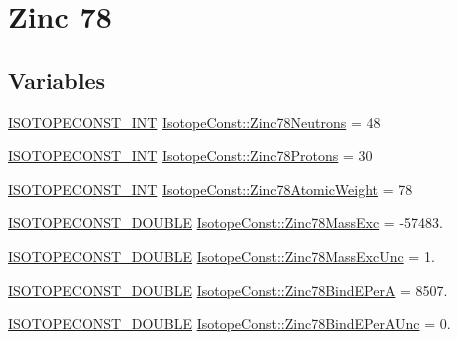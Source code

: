 \hypertarget{group___isotope_const-_zinc-_zn78}{}\section{Zinc 78}
\label{group___isotope_const-_zinc-_zn78}
\subsection*{Variables}
\begin{DoxyCompactItemize}
\item 
\mbox{\hyperlink{group___isotope_const-_macros_ga5f18360b3e99483a35c32d789e62621c}{I\+S\+O\+T\+O\+P\+E\+C\+O\+N\+S\+T\+\_\+\+I\+NT}} \mbox{\hyperlink{group___isotope_const-_zinc-_zn78_ga18bdd09a13d201356f2e234b10324876}{Isotope\+Const\+::\+Zinc78\+Neutrons}} = 48
\item 
\mbox{\hyperlink{group___isotope_const-_macros_ga5f18360b3e99483a35c32d789e62621c}{I\+S\+O\+T\+O\+P\+E\+C\+O\+N\+S\+T\+\_\+\+I\+NT}} \mbox{\hyperlink{group___isotope_const-_zinc-_zn78_gac7eeadc5f3c35cb2d267be5510017b19}{Isotope\+Const\+::\+Zinc78\+Protons}} = 30
\item 
\mbox{\hyperlink{group___isotope_const-_macros_ga5f18360b3e99483a35c32d789e62621c}{I\+S\+O\+T\+O\+P\+E\+C\+O\+N\+S\+T\+\_\+\+I\+NT}} \mbox{\hyperlink{group___isotope_const-_zinc-_zn78_gaee415fd90fd7a371f87d74ef248eedd3}{Isotope\+Const\+::\+Zinc78\+Atomic\+Weight}} = 78
\item 
\mbox{\hyperlink{group___isotope_const-_macros_ga8f45a7272ce02c0b4c65c44636ed719a}{I\+S\+O\+T\+O\+P\+E\+C\+O\+N\+S\+T\+\_\+\+D\+O\+U\+B\+LE}} \mbox{\hyperlink{group___isotope_const-_zinc-_zn78_gafc93be307c6bd43c39233785c4a90a88}{Isotope\+Const\+::\+Zinc78\+Mass\+Exc}} = -\/57483.
\item 
\mbox{\hyperlink{group___isotope_const-_macros_ga8f45a7272ce02c0b4c65c44636ed719a}{I\+S\+O\+T\+O\+P\+E\+C\+O\+N\+S\+T\+\_\+\+D\+O\+U\+B\+LE}} \mbox{\hyperlink{group___isotope_const-_zinc-_zn78_ga65ea92df65d178bb3e7e65a247487443}{Isotope\+Const\+::\+Zinc78\+Mass\+Exc\+Unc}} = 1.
\item 
\mbox{\hyperlink{group___isotope_const-_macros_ga8f45a7272ce02c0b4c65c44636ed719a}{I\+S\+O\+T\+O\+P\+E\+C\+O\+N\+S\+T\+\_\+\+D\+O\+U\+B\+LE}} \mbox{\hyperlink{group___isotope_const-_zinc-_zn78_gac2c756be3faf61ebf65d3deb8d980913}{Isotope\+Const\+::\+Zinc78\+Bind\+E\+PerA}} = 8507.
\item 
\mbox{\hyperlink{group___isotope_const-_macros_ga8f45a7272ce02c0b4c65c44636ed719a}{I\+S\+O\+T\+O\+P\+E\+C\+O\+N\+S\+T\+\_\+\+D\+O\+U\+B\+LE}} \mbox{\hyperlink{group___isotope_const-_zinc-_zn78_gaec4dadcf0801118291a08516d3662fbb}{Isotope\+Const\+::\+Zinc78\+Bind\+E\+Per\+A\+Unc}} = 0.

\end{DoxyCompactItemize}
